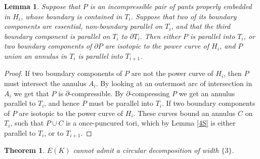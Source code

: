 \documentclass[12pt]{amsart}
\newtheorem{lema}{Lemma}
\newtheorem{teo}{Theorem}
\begin{document}
\begin{lema}\label{morepants}
Suppose that $P$ is an incompressible pair of pants properly embedded in $H_i$, whose boundary is contained in $T_i$. Suppose that two of its boundary components are essential, non-boundary parallel on $T_i$, and that the third boundary component is parallel on $T_i$ to $\partial T_i$. Then either $P$ is parallel into $T_i$, or two boundary components of $\partial P$ are isotopic to the power curve of $H_i$, and $P$ union an annulus in $T_i$ is parallel into $T_{i+1}$.
\end{lema}

\begin{proof} If two boundary components of $P$ are not the power curve of $H_i$, then $P$ must intersect the annulus $A_i$. By looking at an outermost arc of intersection in $A_i$ we get that $P$ is $\partial$-compressible. By $\partial$-compressing $P$ we get an annulus parallel to $T_i$, and hence $P$ must be parallel into $T_i$. If two boundary components of $P$ are isotopic to the power curve of $H_i$. These curves bound an annulus $C$ on $T_i$, such that $P\cup C$ is a once-puncured tori, which by Lemma \ref{4S} is either parallel to $T_i$, or to $T_{i+1}$.
\end{proof}

\begin{teo}\label{principal}
$E(K)$ cannot admit a circular decomposition of width $\{3\}$.
\end{teo}
\end{document}
